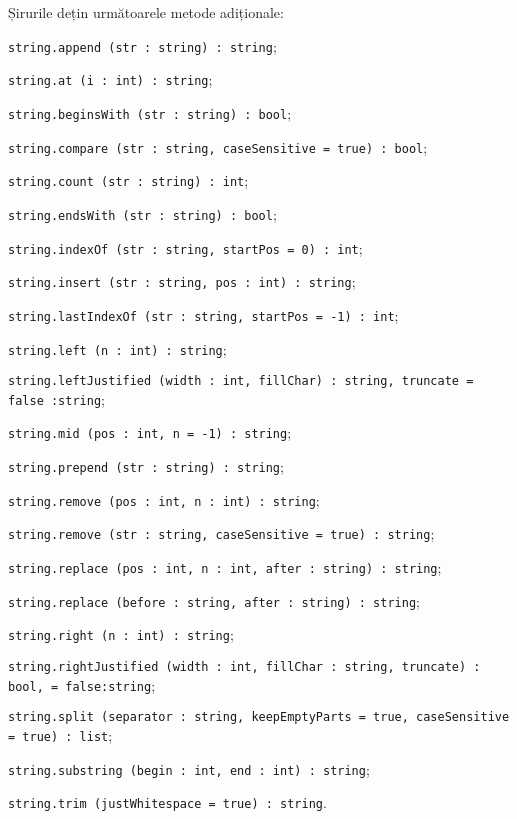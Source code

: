 Șirurile dețin următoarele metode adiționale:
\begin{icItems}
	\item
	\lstinline|string.append (str : string) : string|;
	\item
	\lstinline|string.at (i : int) : string|;
	\item
	\lstinline|string.beginsWith (str : string) : bool|;
	\item
	\lstinline|string.compare (str : string, caseSensitive = true) : bool|;
	\item
	\lstinline|string.count (str : string) : int|;
	\item
	\lstinline|string.endsWith (str : string) : bool|;
	\item
	\lstinline|string.indexOf (str : string, startPos = 0) : int|;
	\item
	\lstinline|string.insert (str : string, pos : int) : string|;
	\item
	\lstinline|string.lastIndexOf (str : string, startPos = -1) : int|;
	\item
	\lstinline|string.left (n : int) : string|;
	\item
	\lstinline|string.leftJustified (width : int, fillChar) : string, truncate = false :string|;
	\item
	\lstinline|string.mid (pos : int, n = -1) : string|;
	\item
	\lstinline|string.prepend (str : string) : string|;
	\item
	\lstinline|string.remove (pos : int, n : int) : string|;
	\item
	\lstinline|string.remove (str : string, caseSensitive = true) : string|;
	\item
	\lstinline|string.replace (pos : int, n : int, after : string) : string|;
	\item
	\lstinline|string.replace (before : string, after : string) : string|;
	\item
	\lstinline|string.right (n : int) : string|;
	\item
	\lstinline|string.rightJustified (width : int, fillChar : string, truncate) : bool, = false:string|;
	\item
	\lstinline|string.split (separator : string, keepEmptyParts = true, caseSensitive = true) : list|;
	\item
	\lstinline|string.substring (begin : int, end : int) : string|;
	\item
	\lstinline|string.trim (justWhitespace = true) : string|.
\end{icItems}

